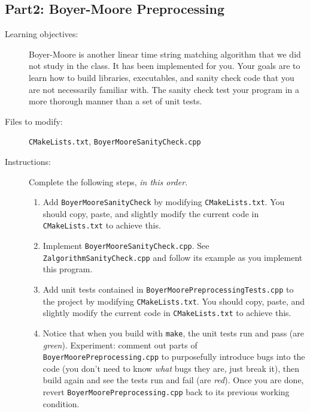 \documentclass[paper=a4, fontsize=11pt]{scrartcl} %
\numberwithin{equation}{section} %
\numberwithin{figure}{section} %
\numberwithin{table}{section} %
\begin{document}
\subsection*{Part2: Boyer-Moore Preprocessing}
\begin{description}
	\item[Learning objectives:] Boyer-Moore is another linear time string matching algorithm that we did not study in the class. It has been implemented for you. Your goals are to learn how to build libraries, executables, and sanity check code that you are not necessarily familiar with. The sanity check test your program in a more thorough manner than a set of unit tests.
	\item[Files to modify:] \texttt{CMakeLists.txt},
		\texttt{BoyerMooreSanityCheck.cpp}
	\item[Instructions:] Complete the following steps, \textit{in this order}.
		\begin{enumerate}
			\item Add \texttt{BoyerMooreSanityCheck} by modifying \texttt{CMakeLists.txt}. You should copy, paste, and slightly modify the current code in \texttt{CMakeLists.txt} to achieve this.
			\item Implement \texttt{BoyerMooreSanityCheck.cpp}. See \texttt{ZalgorithmSanityCheck.cpp} and follow its example as you implement this program.
			\item Add unit tests contained in \texttt{BoyerMoorePreprocessingTests.cpp} to the project by modifying \texttt{CMakeLists.txt}. You should copy, paste, and slightly modify the current code in \texttt{CMakeLists.txt} to achieve this.
			\item Notice that when you build with \texttt{make}, the unit tests run and pass (are \textit{green}). Experiment: comment out parts of \texttt{BoyerMoorePreprocessing.cpp} to purposefully introduce bugs into the code (you don't need to know \textit{what} bugs they are, just break it), then build again and see the tests run and fail (are \textit{red}). Once you are done, revert \texttt{BoyerMoorePreprocessing.cpp} back to its previous working condition.
		\end{enumerate}
\end{description}
\end{document}
